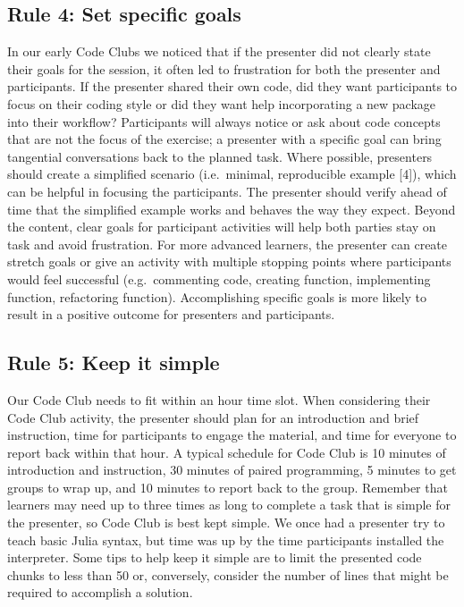 \documentclass[11pt,]{article}
\begin{document}
\subsection{Rule 4: Set specific goals}\label{rule-4-set-specific-goals}

In our early Code Clubs we noticed that if the presenter did not clearly
state their goals for the session, it often led to frustration for both
the presenter and participants. If the presenter shared their own code,
did they want participants to focus on their coding style or did they
want help incorporating a new package into their workflow? Participants
will always notice or ask about code concepts that are not the focus of
the exercise; a presenter with a specific goal can bring tangential
conversations back to the planned task. Where possible, presenters
should create a simplified scenario (i.e.~minimal, reproducible example
{[}4{]}), which can be helpful in focusing the participants. The
presenter should verify ahead of time that the simplified example works
and behaves the way they expect. Beyond the content, clear goals for
participant activities will help both parties stay on task and avoid
frustration. For more advanced learners, the presenter can create
stretch goals or give an activity with multiple stopping points where
participants would feel successful (e.g.~commenting code, creating
function, implementing function, refactoring function). Accomplishing
specific goals is more likely to result in a positive outcome for
presenters and participants.

\subsection{Rule 5: Keep it simple}\label{rule-5-keep-it-simple}

Our Code Club needs to fit within an hour time slot. When considering
their Code Club activity, the presenter should plan for an introduction
and brief instruction, time for participants to engage the material, and
time for everyone to report back within that hour. A typical schedule
for Code Club is 10 minutes of introduction and instruction, 30 minutes
of paired programming, 5 minutes to get groups to wrap up, and 10
minutes to report back to the group. Remember that learners may need up
to three times as long to complete a task that is simple for the
presenter, so Code Club is best kept simple. We once had a presenter try
to teach basic Julia syntax, but time was up by the time participants
installed the interpreter. Some tips to help keep it simple are to limit
the presented code chunks to less than 50 or, conversely, consider the
number of lines that might be required to accomplish a solution.
\end{document}
